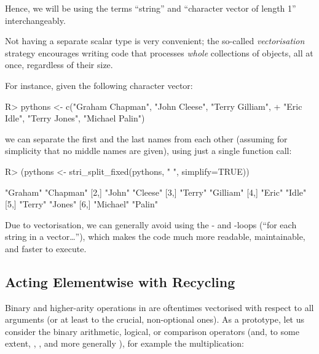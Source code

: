 \documentclass[nojss]{jss}
\begin{document}
\noindent
Hence, we will be using the terms ``string'' and ``character vector
of length 1'' interchangeably.

Not having a separate scalar type is very convenient; the so-called
\emph{vectorisation} strategy encourages writing code that
processes \textit{whole} collections of objects, all at once,
regardless of their size.

For instance, given the following character vector:


\begin{Schunk}
\begin{Sinput}
R> pythons <- c("Graham Chapman", "John Cleese", "Terry Gilliam",
+    "Eric Idle", "Terry Jones", "Michael Palin")
\end{Sinput}
\end{Schunk}

\noindent
we can separate the first and the last names from
each other (assuming for simplicity that no middle names are given),
using just a single function call:

\begin{Schunk}
\begin{Sinput}
R> (pythons <- stri_split_fixed(pythons, " ", simplify=TRUE))
\end{Sinput}
\begin{Soutput}
     [,1]      [,2]
[1,] "Graham"  "Chapman"
[2,] "John"    "Cleese"
[3,] "Terry"   "Gilliam"
[4,] "Eric"    "Idle"
[5,] "Terry"   "Jones"
[6,] "Michael" "Palin"
\end{Soutput}
\end{Schunk}

\noindent
Due to {vectorisation}, we can generally
avoid using the - and -loops
(``for each string in a vector\dots''),
which makes the code much more readable, maintainable, and faster to execute.





\subsection{Acting Elementwise with Recycling}



Binary and higher-arity operations in 
are oftentimes vectorised with respect to all arguments
(or at least to the crucial, non-optional ones).
As a prototype, let us consider the binary arithmetic,
logical, or comparison operators
(and, to some extent, ,
, and more generally ),
for example the multiplication:
\end{document}
